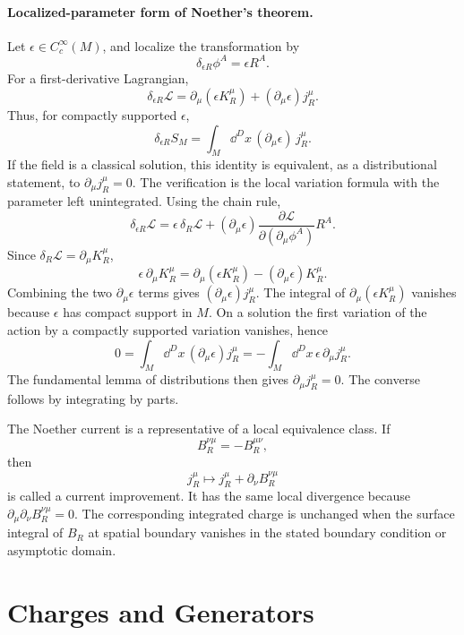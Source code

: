 \paragraph{Localized-parameter form of Noether's theorem.}
Let \(\epsilon\in C_c^\infty(M)\), and localize the transformation by
\[
  \delta_{\epsilon R}\phi^A=\epsilon R^A .
\]
For a first-derivative Lagrangian,
\[
  \delta_{\epsilon R}\mathcal L
  =
  \partial_\mu(\epsilon K_R^\mu)
  +
  (\partial_\mu\epsilon)j_R^\mu .
\]
Thus, for compactly supported \(\epsilon\),
\[
  \delta_{\epsilon R}S_M
  =
  \int_M\dd^Dx\,(\partial_\mu\epsilon)\,j_R^\mu .
\]
If the field is a classical solution, this identity is equivalent, as a
distributional statement, to \(\partial_\mu j_R^\mu=0\).
The verification is the local variation formula with the parameter left
unintegrated.  Using the chain rule,
\[
  \delta_{\epsilon R}\mathcal L
  =
  \epsilon\,\delta_R\mathcal L
  +
  (\partial_\mu\epsilon)
  \frac{\partial\mathcal L}{\partial(\partial_\mu\phi^A)}R^A .
\]
Since \(\delta_R\mathcal L=\partial_\mu K_R^\mu\),
\[
  \epsilon\,\partial_\mu K_R^\mu
  =
  \partial_\mu(\epsilon K_R^\mu)-(\partial_\mu\epsilon)K_R^\mu .
\]
Combining the two \(\partial_\mu\epsilon\) terms gives
\((\partial_\mu\epsilon)j_R^\mu\).  The integral of
\(\partial_\mu(\epsilon K_R^\mu)\) vanishes because \(\epsilon\) has compact
support in \(M\).  On a solution the first variation of the action by a
compactly supported variation vanishes, hence
\[
  0
  =
  \int_M\dd^Dx\,(\partial_\mu\epsilon)j_R^\mu
  =
  -\int_M\dd^Dx\,\epsilon\,\partial_\mu j_R^\mu .
\]
The fundamental lemma of distributions then gives
\(\partial_\mu j_R^\mu=0\).  The converse follows by integrating by parts.

\begin{definition}
\label{def:current-improvement}
The Noether current is a representative of a local equivalence class.  If
\[
  B_R^{\nu\mu}=-B_R^{\mu\nu},
\]
then
\[
  j_R^\mu\longmapsto j_R^\mu+\partial_\nu B_R^{\nu\mu}
\]
is called a current improvement.  It has the same local divergence because
\(\partial_\mu\partial_\nu B_R^{\nu\mu}=0\).  The corresponding integrated
charge is unchanged when the surface integral of \(B_R\) at spatial boundary
vanishes in the stated boundary condition or asymptotic domain.
\end{definition}

\section{Charges and Generators}

